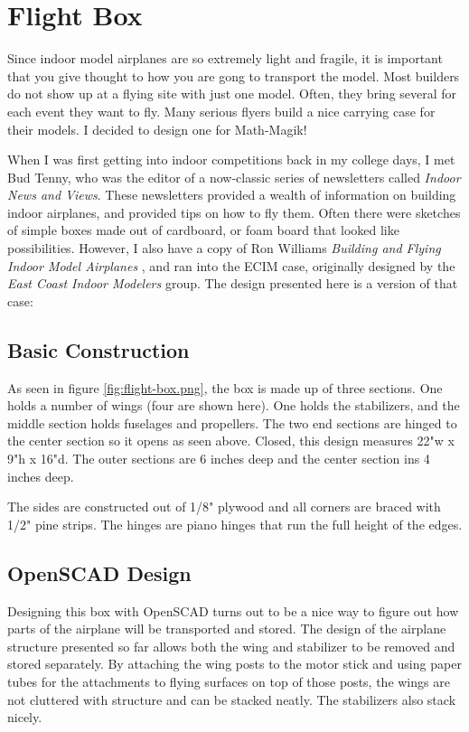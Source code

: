 \section{Flight Box}

Since indoor model airplanes are so extremely light and fragile, it is
important that you give thought to how you are gong to transport the model.
Most builders do not show up at a flying site with just one model. Often, they
bring several for each event they want to fly. Many serious flyers build a nice
carrying case for their models. I decided to design one for Math-Magik!

When I was first getting into indoor competitions back in my college days, I
met Bud Tenny, who was the editor of a now-classic series of newsletters called
{\it Indoor News and Views}. These newsletters provided a wealth of information on
building indoor airplanes, and provided tips on how to fly them. Often there
were sketches of simple boxes made out of cardboard, or foam board that looked
like possibilities. However, I also have a copy of Ron Williams {\it Building and
Flying Indoor Model Airplanes} \cite{williams} , and ran into the ECIM
case, originally designed by the {\it East Coast Indoor Modelers} group. The design
presented here is a version of that case:



\subsection{Basic Construction}

As seen in figure \ref{fig:flight-box.png}, the box is made up of three
sections. One holds a number of wings (four are shown here). One holds the
stabilizers, and the middle section holds fuselages and propellers. The two end
sections are hinged to the center section so it opens as seen above. Closed,
this design measures 22"w x 9"h x 16"d. The outer sections are 6 inches deep
and the center section ins 4 inches deep.

The sides are constructed out of 1/8" plywood and all corners are braced with
1/2" pine strips. The hinges are piano hinges that run the full height of the
edges.

\subsection{OpenSCAD Design}

Designing this box with OpenSCAD turns out to be a nice way to figure out how
parts of the airplane will be transported and stored. The design of the
airplane structure presented so far allows both the wing and stabilizer to be
removed and stored separately. By attaching the wing posts to the motor stick and
using paper tubes for the attachments to flying surfaces on top of those posts,
the wings are not cluttered with structure and can be stacked neatly. The
stabilizers also stack nicely.

